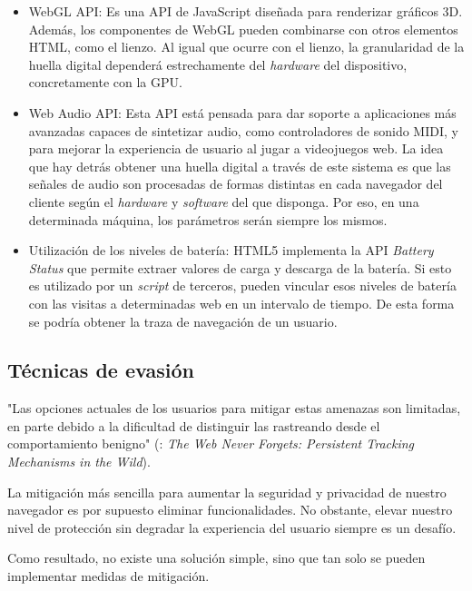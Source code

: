 \begin{itemize}
	\item WebGL API: Es una API de JavaScript diseñada para renderizar gráficos 3D. Además, los componentes de WebGL pueden combinarse con otros elementos HTML, como el lienzo\cite{canvas_paper}. Al igual que ocurre con el lienzo, la granularidad de la huella digital dependerá estrechamente del \textit{hardware} del dispositivo, concretamente con la GPU.
	
	\item Web Audio API\cite{audio_w3c}: Esta API está pensada para dar soporte a aplicaciones más avanzadas capaces de sintetizar audio, como controladores de sonido MIDI, y para mejorar la experiencia de usuario al jugar a videojuegos web. La idea que hay detrás obtener una huella digital a través de este sistema es que las señales de audio son procesadas de formas distintas en cada navegador del cliente según el \textit{hardware} y \textit{software} del que disponga. Por eso, en una determinada máquina, los parámetros serán siempre los mismos.
	
	\item Utilización de los niveles de batería: HTML5 implementa la API \textit{Battery Status} que permite extraer valores de carga y descarga de la batería. Si esto es utilizado por un \textit{script} de terceros, pueden vincular esos niveles de batería con las visitas a determinadas web en un intervalo de tiempo. De esta forma se podría obtener la traza de navegación de un usuario\cite{battery_paper}.
	
\end{itemize}

\subsection{Técnicas de evasión}
"Las opciones actuales de los usuarios para mitigar estas amenazas son limitadas, en parte debido a la dificultad de distinguir las rastreando desde el comportamiento benigno" (\cite{never_forget_paper}: \textit{The Web Never Forgets: Persistent Tracking Mechanisms in the Wild}). \par 

La mitigación más sencilla para aumentar la seguridad y privacidad de nuestro navegador es por supuesto eliminar funcionalidades. No obstante, elevar nuestro nivel de protección sin degradar la experiencia del usuario siempre es un desafío. \par 

Como resultado, no existe una solución simple, sino que tan solo se pueden implementar medidas de mitigación\cite{mitigations_w3c}. \par 

